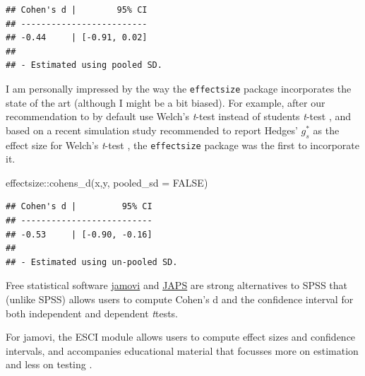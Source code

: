 \documentclass[
]{krantz}
\newenvironment{Shaded}{\begin{snugshade}}{\end{snugshade}}
\newcommand{\AttributeTok}[1]{\textcolor[rgb]{0.77,0.63,0.00}{#1}}
\newcommand{\ConstantTok}[1]{\textcolor[rgb]{0.00,0.00,0.00}{#1}}
\newcommand{\FunctionTok}[1]{\textcolor[rgb]{0.00,0.00,0.00}{#1}}
\newcommand{\NormalTok}[1]{#1}
\newcommand{\SpecialCharTok}[1]{\textcolor[rgb]{0.00,0.00,0.00}{#1}}
\begin{document}
\begin{verbatim}
## Cohen's d |        95% CI
## -------------------------
## -0.44     | [-0.91, 0.02]
## 
## - Estimated using pooled SD.
\end{verbatim}

I am personally impressed by the way the \texttt{effectsize} package incorporates the state of the art (although I might be a bit biased). For example, after our recommendation to by default use Welch's \emph{t}-test instead of students \emph{t}-test \citep{delacre_why_2017}, and based on a recent simulation study recommended to report Hedges' \(g_s^*\) as the effect size for Welch's \emph{t}-test \citep{delacre_why_2021}, the \texttt{effectsize} package was the first to incorporate it.

\begin{Shaded}
\begin{Highlighting}[]
\NormalTok{effectsize}\SpecialCharTok{::}\FunctionTok{cohens\_d}\NormalTok{(x,y, }\AttributeTok{pooled\_sd =} \ConstantTok{FALSE}\NormalTok{)}
\end{Highlighting}
\end{Shaded}

\begin{verbatim}
## Cohen's d |         95% CI
## --------------------------
## -0.53     | [-0.90, -0.16]
## 
## - Estimated using un-pooled SD.
\end{verbatim}

Free statistical software \href{https://www.jamovi.org/}{jamovi} and \href{https://jasp-stats.org/}{JAPS} are strong alternatives to SPSS that (unlike SPSS) allows users to compute Cohen's d and the confidence interval for both independent and dependent \emph{t}tests.

For jamovi, the ESCI module allows users to compute effect sizes and confidence intervals, and accompanies educational material that focusses more on estimation and less on testing \citep{cumming_introduction_2016}.
\end{document}
